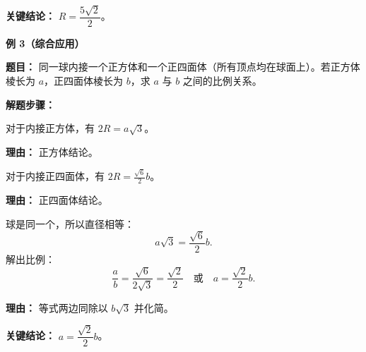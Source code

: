 \begin{examplebox}
	\textbf{\textcolor{CExample}{关键结论：}}
	$R = \dfrac{5\sqrt{2}}{2}$。

	\medskip
	\textbf{\textcolor{CExample}{例 3（综合应用）}}

	\textbf{\textcolor{CExample}{题目：}}
	同一球内接一个正方体和一个正四面体（所有顶点均在球面上）。若正方体棱长为 $a$，正四面体棱长为 $b$，求 $a$ 与 $b$ 之间的比例关系。

	\textbf{\textcolor{CExample}{解题步骤：}}
	\begin{description}[style=nextline, leftmargin=2.8em, labelsep=0.5em, itemsep=0.45em]
		\item[\textbf{第一步（正方体关系）：}]
			对于内接正方体，有 $2R = a\sqrt{3}$。
			\par\textbf{理由：} 正方体结论。

		\item[\textbf{第二步（正四面体关系）：}]
			对于内接正四面体，有 $2R = \frac{\sqrt{6}}{2}b$。
			\par\textbf{理由：} 正四面体结论。

		\item[\textbf{第三步（等量代换）：}]
			球是同一个，所以直径相等：
			\[
				a\sqrt{3} = \frac{\sqrt{6}}{2}b.
			\]
			解出比例：
			\[
				\frac{a}{b} = \frac{\sqrt{6}}{2\sqrt{3}} = \frac{\sqrt{2}}{2}
				\quad\text{或}\quad
				a = \frac{\sqrt{2}}{2}b.
			\]
			\par\textbf{理由：} 等式两边同除以 $b\sqrt{3}$ 并化简。
	\end{description}

	\textbf{\textcolor{CExample}{关键结论：}}
	$a = \dfrac{\sqrt{2}}{2}b$。
\end{examplebox}
